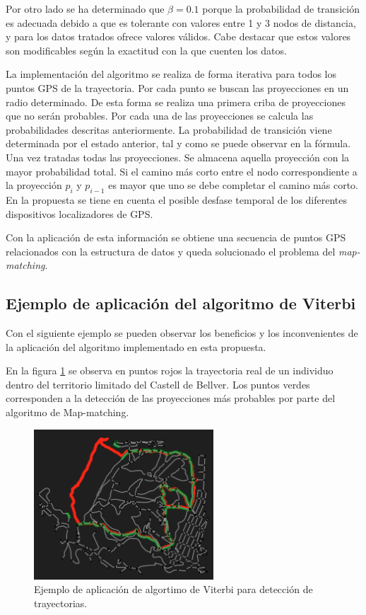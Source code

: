 Por otro lado se ha determinado que $\beta = 0.1$ porque la probabilidad de transición 
es adecuada debido a que es tolerante con valores entre 1 y 3 nodos de distancia, y para los datos tratados ofrece valores válidos. Cabe destacar que estos valores son modificables según la exactitud con la que cuenten los datos.


La implementación del algoritmo se realiza de forma iterativa para todos los puntos \ac{GPS} de la trayectoria.
Por cada punto se buscan las proyecciones en un radio determinado. De esta forma se realiza una primera criba de proyecciones que no serán probables.
Por cada una de las proyecciones se calcula las probabilidades descritas anteriormente. La probabilidad de 
transición viene determinada por el estado anterior, tal y como se puede observar en la fórmula.
Una vez tratadas todas las proyecciones. Se almacena aquella proyección con la mayor probabilidad total. Si el 
camino más corto entre el nodo correspondiente a la proyección $p_{i}$ y $p_{i-1}$ es mayor que uno se debe 
completar el camino más corto. En la propuesta se tiene en cuenta el posible desfase temporal de los diferentes 
dispositivos localizadores de \ac{GPS}. 

Con la aplicación de esta información se obtiene una secuencia de puntos \ac{GPS} relacionados con la estructura de 
datos y queda solucionado el problema del \textit{map-matching}.

\subsection{Ejemplo de aplicación del algoritmo de Viterbi}
Con el siguiente ejemplo se pueden observar los beneficios y los inconvenientes de la aplicación del algoritmo 
implementado en esta propuesta.

En la figura \ref{figure:MapMatching1} se observa en puntos rojos la trayectoria real de un individuo dentro del 
territorio limitado del Castell de Bellver. Los puntos verdes corresponden a la detección de las proyecciones 
más probables por parte del algoritmo de Map-matching.

\begin{figure}[htb]
\begin{center}
\includegraphics[width=0.6\textwidth]{./Imagenes/MapMatching1.png}
\caption{Ejemplo de aplicación de algortimo de Viterbi para detección de trayectorias.}
\label{figure:MapMatching1}
\end{center}
\end{figure}

